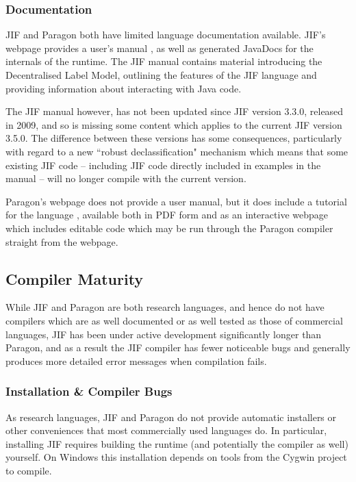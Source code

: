 \subsubsection{Documentation}

JIF and Paragon both have limited language documentation available. JIF's webpage \cite{jifwebsite} provides a user's manual \cite{jifmanual}, as well as generated JavaDocs for the internals of the runtime. The JIF manual contains material introducing the Decentralised Label Model, outlining the features of the JIF language and providing information about interacting with Java code.

The JIF manual however, has not been updated since JIF version 3.3.0, released in 2009, and so is missing some content which applies to the current JIF version 3.5.0. The difference between these versions has some consequences, particularly with regard to a new ``robust declassification" mechanism which means that some existing JIF code -- including JIF code directly included in examples in the manual -- will no longer compile with the current version.

Paragon's webpage \cite{parawebsite} does not provide a user manual, but it does include a tutorial for the language \cite{paratutorial}, available both in PDF form and as an interactive webpage which includes editable code which may be run through the Paragon compiler straight from the webpage.

\subsection{Compiler Maturity}

While JIF and Paragon are both research languages, and hence do not have compilers which are as well documented or as well tested as those of commercial languages, JIF has been under active development significantly longer than Paragon, and as a result the JIF compiler has fewer noticeable bugs and generally produces more detailed error messages when compilation fails.

\subsubsection{Installation \& Compiler Bugs}

As research languages, JIF and Paragon do not provide automatic installers or other conveniences that most commercially used languages do. In particular, installing JIF requires building the runtime (and potentially the compiler as well) yourself. On Windows this installation depends on tools from the Cygwin project \cite{cygwinpage} to compile.

